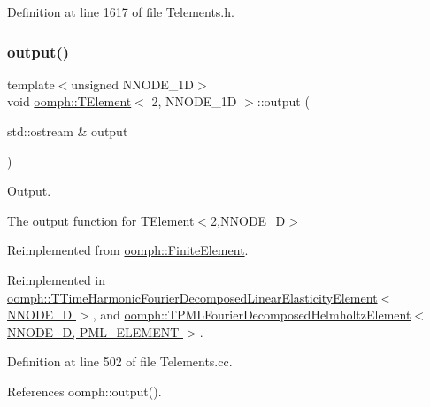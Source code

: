 Definition at line 1617 of file Telements.\+h.

\mbox{\label{classoomph_1_1TElement_3_012_00_01NNODE__1D_01_4_ad66ccbcca9ee2a4eb3c24bdd21c096f9}} 
\subsubsection{\texorpdfstring{output()}{output()}\hspace{0.1cm}{\footnotesize\ttfamily [1/4]}}
{\footnotesize\ttfamily template$<$unsigned N\+N\+O\+D\+E\+\_\+1D$>$ \\
void \hyperlink{classoomph_1_1TElement}{oomph\+::\+T\+Element}$<$ 2, N\+N\+O\+D\+E\+\_\+1D $>$\+::output (\begin{DoxyParamCaption}\item[{std\+::ostream \&}]{output }\end{DoxyParamCaption})\hspace{0.3cm}{\ttfamily [virtual]}}



Output. 

The output function for \hyperlink{classoomph_1_1TElement_3_012_00_01NNODE__1D_01_4}{T\+Element$<$2,\+N\+N\+O\+D\+E\+\_\+D$>$} 

Reimplemented from \hyperlink{classoomph_1_1FiniteElement_a2ad98a3d2ef4999f1bef62c0ff13f2a7}{oomph\+::\+Finite\+Element}.



Reimplemented in \hyperlink{classoomph_1_1TTimeHarmonicFourierDecomposedLinearElasticityElement_ae14527add57636a4412ea584dd66cdbe}{oomph\+::\+T\+Time\+Harmonic\+Fourier\+Decomposed\+Linear\+Elasticity\+Element$<$ N\+N\+O\+D\+E\+\_\+D $>$}, and \hyperlink{classoomph_1_1TPMLFourierDecomposedHelmholtzElement_a7740f7614bd05db89ddf4e39668b8a75}{oomph\+::\+T\+P\+M\+L\+Fourier\+Decomposed\+Helmholtz\+Element$<$ N\+N\+O\+D\+E\+\_\+D, P\+M\+L\+\_\+\+E\+L\+E\+M\+E\+N\+T $>$}.



Definition at line 502 of file Telements.\+cc.



References oomph\+::output().

